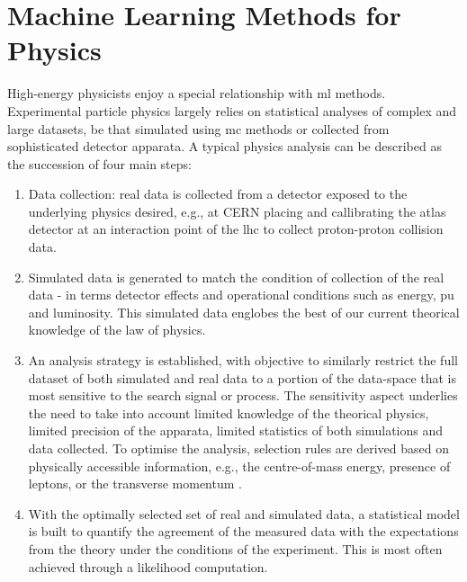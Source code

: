 \section{Machine Learning Methods for Physics}
High-energy physicists enjoy a special relationship with \gls{ml} methods. Experimental particle physics largely relies on statistical analyses of complex and large datasets, be that simulated using \gls{mc} methods or collected from sophisticated detector apparata. A typical physics analysis can be described as the succession of four main steps:
\begin{enumerate}
    \item Data collection: real data is collected from a detector exposed to the underlying physics desired, e.g., at CERN placing and callibrating the \gls{atlas} detector at an interaction point of the \gls{lhc} to collect proton-proton collision data. 
    \item Simulated data is generated to match the condition of collection of the real data - in terms detector effects and operational conditions such as energy, \gls{pu} and luminosity. This simulated data englobes the best of our current theorical knowledge of the law of physics. 
    \item An analysis strategy is established, with objective to similarly restrict the full dataset of both simulated and real data to a portion of the data-space that is most sensitive to the search signal or process. The sensitivity aspect underlies the need to take into account limited knowledge of the theorical physics, limited precision of the apparata, limited statistics of both simulations and data collected. To optimise the analysis, selection rules are derived based on physically accessible information, e.g., the centre-of-mass energy, presence of leptons, or the transverse momentum \pt.
    \item With the optimally selected set of real and simulated data, a statistical model is built to quantify the agreement of the measured data with the expectations from the theory under the conditions of the experiment. This is most often achieved through a likelihood computation.
\end{enumerate}

